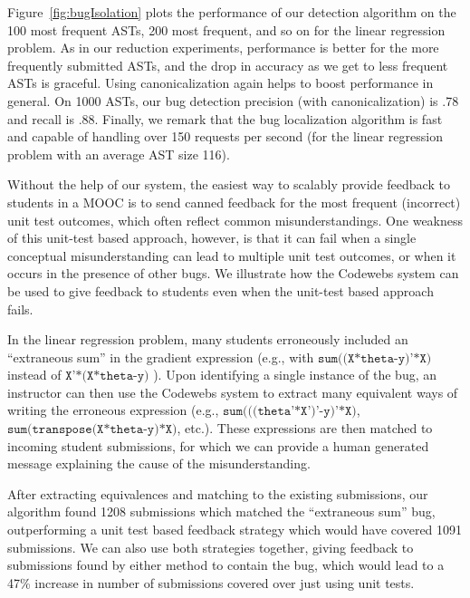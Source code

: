 
Figure~\ref{fig:bugIsolation} plots the performance  of our detection algorithm
on the 100 most frequent ASTs, 200 most frequent, and so on for the linear regression problem.
As in our reduction experiments, performance is better 
for the more frequently submitted ASTs, and the drop in accuracy as we get to less frequent ASTs is graceful.
Using canonicalization again helps to boost performance in general.
On 1000 ASTs, our bug detection precision (with canonicalization) is .78 and recall is .88.
Finally, we remark that the bug localization algorithm is fast and capable of  handling over 150 requests per second (for the
linear regression problem with an average AST size 116).

Without the help of our system, the easiest way to scalably provide feedback to students in a MOOC is to 
send canned feedback for the most frequent (incorrect) unit test outcomes, which often reflect common misunderstandings.
One weakness of this unit-test based approach, however, is that it can fail when a single conceptual misunderstanding
can lead to multiple unit test outcomes, or when it occurs in the presence of other bugs.
We  illustrate  how the Codewebs system can be used to give feedback to students even
when the unit-test based approach fails.

In the linear regression problem, many students
erroneously included an ``extraneous sum'' in the gradient expression
(e.g., with $\texttt{sum((X*theta-y)'*X)}$ instead of   $\texttt{X'*(X*theta-y)}$ ). 
Upon identifying a single instance of the bug, an instructor can then use
the Codewebs system 
to extract many equivalent ways of writing the erroneous expression (e.g., $\texttt{sum(((theta'*X')'-y)'*X)}$, $\texttt{sum(transpose(X*theta-y)*X)}$, etc.).   
These expressions are then matched to incoming student submissions, for which we can
provide a human generated message explaining the cause of the misunderstanding.

After extracting equivalences and matching to the existing submissions, our algorithm
found 1208 submissions which matched the ``extraneous sum'' bug, outperforming a unit test based
feedback strategy which would have covered 1091 submissions.  We can also use both strategies together, giving feedback to submissions found by either
method to contain the bug, 
which would lead to a 47\% increase in number of submissions covered over just using unit tests.


